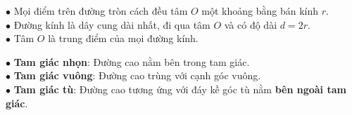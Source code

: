 \documentclass[14pt,a4paper,oneside]{extbook}
\begin{document}
\noindent
\begin{minipage}[t]{0.52\textwidth}
  \begin{tcolorbox}[
    enhanced,
    title={\footnotesize\bfseries\color{white}\faCircleO\ 2. Đường tròn và Hình tròn},
    colback=teal!2!white,
    colframe=teal!75!black,
    arc=2.5mm, boxrule=0.8pt, top=1.8mm, bottom=1.8mm, left=2.2mm, right=2.2mm
  ]
    \footnotesize
    $\bullet$ Mọi điểm trên đường tròn cách đều tâm $O$ một khoảng bằng bán kính $r$.\\
    $\bullet$ Đường kính là dây cung dài nhất, đi qua tâm $O$ và có độ dài $d = 2r$.\\
    $\bullet$ Tâm $O$ là trung điểm của mọi đường kính.
  \end{tcolorbox}
\end{minipage}%
\hfill
\begin{minipage}[t]{0.46\textwidth}
  \begin{tcolorbox}[
    enhanced,
    title={\footnotesize\bfseries\color{white}\faRulerCombined\ 3. Vị trí đường cao tam giác},
    colback=purple!2!white,
    colframe=purple!70!black,
    arc=2.5mm, boxrule=0.8pt, top=1.8mm, bottom=1.8mm, left=2mm, right=2mm
  ]
    \footnotesize
    $\bullet$ \textbf{Tam giác nhọn}: Đường cao nằm bên trong tam giác.\\
    $\bullet$ \textbf{Tam giác vuông}: Đường cao trùng với cạnh góc vuông.\\
    $\bullet$ \textbf{Tam giác tù}: Đường cao tương ứng với đáy kề góc tù nằm \textbf{bên ngoài tam giác}.
  \end{tcolorbox}
\end{minipage}

\vspace{3mm}
\end{document}

